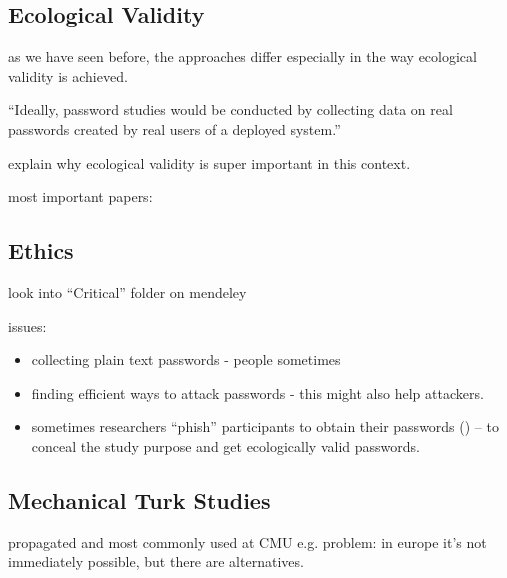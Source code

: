 

	\subsection{Ecological Validity}
	
	
	
 as we have seen before, the approaches differ especially in the way ecological validity is achieved.
 
 
 ``Ideally, password studies would be conducted by collecting data on real passwords created by real users of a deployed system.'' \cite{Komanduri2011OfPasswordsAndPeople}
 
 explain why ecological validity is super important in this context.
 
 most important papers: \cite{Fahl2013EcologicalValidityPasswordStudy, Krol2016ExperimentDesign}
	

	\subsection{Ethics}
	look into ``Critical'' folder on mendeley
	
	issues:
	\begin{itemize}
		\item collecting plain text passwords - people sometimes
		\item finding efficient ways to attack passwords - this might also help attackers. 
		\item sometimes researchers ``phish'' participants to obtain their passwords (\cite{Egelman2013DoesMyPasswordGoUpToEleven, Haque2014Hierarchy, Mazurek2013Measuring}) -- to conceal the study purpose and get ecologically valid passwords. 
	\end{itemize}
	

	\subsection{Mechanical Turk Studies}
	
	propagated and most commonly used at CMU e.g. \cite{Mazurek2013Measuring} \cite{Shay2014CanLongPasswordsBeSecureAndUsable} \cite{Shay2016DesigningPasswordPolicies}
	\cite{Shay2015UsablePoliciesMTurk}
	\cite{Ur2016PerceptionsPassword} \cite{Melicher2016UsabilityMobileTextPasswords} \cite{Ur2017DataDrivenPWMeter}
	problem: in europe it's not immediately possible, but there are alternatives. 
	
